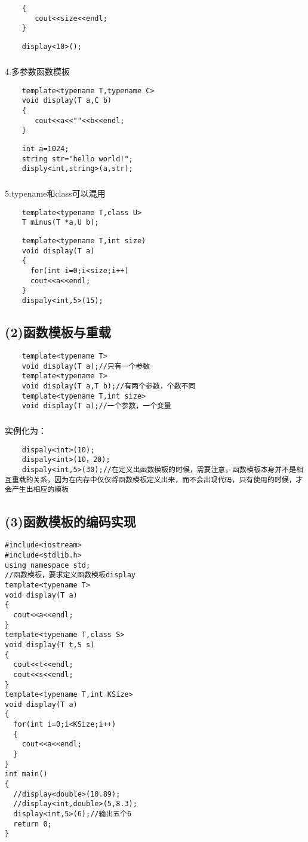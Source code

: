 \documentclass{article}
\begin{document}
\begin{CJK}{UTF8}{gbsn}
\begin{verbatim}
    {
       cout<<size<<endl;
    }
\end{verbatim}
\begin{verbatim}
    display<10>();
\end{verbatim}
\subparagraph*{}
4.多参数函数模板
\begin{verbatim}
    template<typename T,typename C>
    void display(T a,C b)
    {
       cout<<a<<""<<b<<endl;
    }
\end{verbatim}
\begin{verbatim}
    int a=1024;
    string str="hello world!";
    disply<int,string>(a,str);
\end{verbatim}
\subparagraph*{}
5.typename和class可以混用
\begin{verbatim}
    template<typename T,class U>
    T minus(T *a,U b);
\end{verbatim}
\begin{verbatim}
    template<typename T,int size)
    void display(T a)
    {
      for(int i=0;i<size;i++)
      cout<<a<<endl;
    }
    dispaly<int,5>(15);
\end{verbatim}
\subsection*{(2)函数模板与重载}
\begin{verbatim}
    template<typename T>
    void display(T a);//只有一个参数
    template<typename T>
    void display(T a,T b);//有两个参数，个数不同
    template<typename T,int size>
    void display(T a);//一个参数，一个变量
\end{verbatim}
\subparagraph*{}
实例化为：
\begin{verbatim}
    dispaly<int>(10);
    dispaly<int>(10，20);
    dispaly<int,5>(30);//在定义出函数模板的时候，需要注意，函数模板本身并不是相互重载的关系，因为在内存中仅仅将函数模板定义出来，而不会出现代码，只有使用的时候，才会产生出相应的模板
\end{verbatim}
\subsection*{(3)函数模板的编码实现}
\begin{verbatim}
#include<iostream>
#include<stdlib.h>
using namespace std;
//函数模板，要求定义函数模板display
template<typename T>
void display(T a)
{
  cout<<a<<endl;
}
template<typename T,class S>
void display(T t,S s)
{
  cout<<t<<endl;
  cout<<s<<endl;
}
template<typename T,int KSize>
void display(T a)
{
  for(int i=0;i<KSize;i++)
  {
    cout<<a<<endl;
  }
}
int main()
{
  //display<double>(10.89);
  //display<int,double>(5,8.3);
  display<int,5>(6);//输出五个6
  return 0;
}
\end{verbatim}

\end{CJK}
\end{document}

